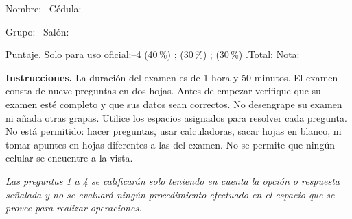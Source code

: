 \documentclass[11pt]{article}
\begin{document}
\examheader

\vspace{4pt}
\noindent Nombre: \dotfill\ Cédula: \dotfill

\vspace{4pt}
\noindent Grupo: \dotfill\ Salón: \dotfill

\vspace{4pt}
\noindent Puntaje. Solo para uso oficial:--4 (40\,\%) \dotfill; (30\,\%) \dotfill; (30\,\%) \dotfill.\quad Total: \dotfill\quad Nota: \dotfill

\vspace{6pt}
\noindent\textbf{Instrucciones.} La duración del examen es de 1 hora y 50 minutos. El examen consta de nueve preguntas en dos hojas. Antes de empezar verifique que su examen esté completo y que sus datos sean correctos. No desengrape su examen ni añada otras grapas. Utilice los espacios asignados para resolver cada pregunta. No está permitido: hacer preguntas, usar calculadoras, sacar hojas en blanco, ni tomar apuntes en hojas diferentes a las del examen. No se permite que ningún celular se encuentre a la vista.

\vspace{8pt}
\noindent\textit{Las preguntas 1 a 4 se calificarán solo teniendo en cuenta la opción o respuesta señalada y no se evaluará ningún procedimiento efectuado en el espacio que se provee para realizar operaciones.}
\end{document}
